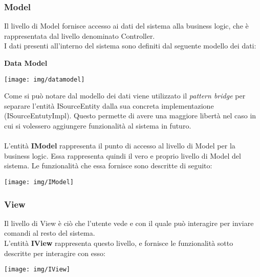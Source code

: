 \documentclass{article}
\begin{document}
  \subsubsection{Model}
  Il livello di Model fornisce accesso ai dati del sistema alla business logic, che è rappresentata dal livello denominato Controller.\\
  I dati presenti all'interno del sistema sono definiti dal seguente modello dei dati:
  \begin{framed}
    \centering
    \textbf{Data Model}
    \begin{center}
      \texttt{[image: img/datamodel]}
    \end{center}
  \end{framed}
  Come si può notare dal modello dei dati viene utilizzato il \textit{pattern bridge} per separare l'entità ISourceEntity dalla sua concreta
  implementazione (ISourceEntutyImpl). Questo permette di avere una maggiore libertà nel caso in cui si volessero aggiungere funzionalità
  al sistema in futuro.\\
  \\L'entità \textbf{IModel} rappresenta il punto di accesso al livello di Model per la business logic. Essa rappresenta quindi il vero e
  proprio livello di Model del sistema. Le funzionalità che essa fornisce sono descritte di seguito:
  \begin{center}
    \texttt{[image: img/IModel]}
  \end{center}
  \subsubsection{View}
  Il livello di View è ciò che l'utente vede e con il quale può interagire per inviare comandi al resto del sistema.\\
  L'entità \textbf{IView} rappresenta questo livello, e fornisce le funzionalità sotto descritte per interagire con esso:
  \begin{center}
    \texttt{[image: img/IView]}
  \end{center}
\end{document}
